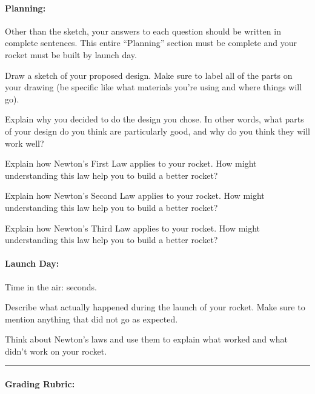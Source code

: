 \documentclass[10pt]{exam}
\begin{document}
\paragraph{Planning:}
  Other than the sketch, your answers to each question should be written in complete sentences.  This entire ``Planning'' section must be complete and your rocket must be built by launch day.

\begin{questions}
  \question
    Draw a sketch of your proposed design.  Make sure to label all of the parts on your drawing (be specific like what materials you're using and where things will go).
    \vs[2]

  \question 
    Explain why you decided to do the design you chose.  In other words, what parts of your design do you think are particularly good, and why do you think they will work well? 
    \vs

  \pagebreak
  
  \question
    Explain how Newton's First Law applies to your rocket.  How might understanding this law help you to build a better rocket?
    \vs
  
  \question
    Explain how Newton's Second Law applies to your rocket.  How might understanding this law help you to build a better rocket?
    \vs

  \question
    Explain how Newton's Third Law applies to your rocket.  How might understanding this law help you to build a better rocket?
    \vs
  
  \begin{EnvUplevel}
    \paragraph{Launch Day:}
      Time in the air: \fillin[][4em] seconds.
  \end{EnvUplevel}

  \question
    Describe what actually happened during the launch of your rocket.  Make sure to mention anything that did not go as expected.
    \vs[2]
  
  \question
    Think about Newton's laws and use them to explain what worked and what didn't work on your rocket.
    \vs


\end{questions}

\hrule
\paragraph{Grading Rubric:} \hfill
\end{document}
